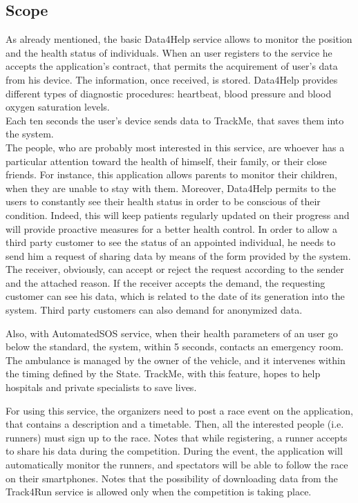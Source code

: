 \subsection{Scope}
As already mentioned, the basic Data4Help service allows to monitor the position and the health status of individuals. When an user registers to the service he accepts the application's contract, that permits the acquirement of user's data from his device. The information, once received, is stored. Data4Help provides different types of diagnostic procedures:  heartbeat, blood pressure and blood oxygen saturation levels.\\ 
Each ten seconds the user's device sends data to TrackMe, that saves them into the system. \\ 
The people, who are probably most interested in this service, are whoever has a particular attention toward the health of himself, their family, or their close friends.
For instance, this application allows parents to monitor their children, when they are unable to stay with them. 
Moreover, Data4Help permits to the users to constantly see their health status in order to be conscious of their condition. Indeed, this will keep patients regularly updated on their progress and will provide proactive measures for a better health control. 
In order to allow a third party customer to see the status of an appointed individual, he needs to send him a request of sharing data by means of the form provided by the system. 
The receiver, obviously, can accept or reject the request according to the sender and the attached reason. 
If the receiver accepts the demand, the requesting customer can see his data, which is related to the date of its generation into the system. Third party customers can also demand for anonymized data. \\ 

\par
Also, with AutomatedSOS service, when their health parameters of an user go below the standard, the system, within 5 seconds, contacts an emergency room.
The ambulance is managed by the owner of the vehicle, and it intervenes within the timing defined by the State.
TrackMe, with this feature, hopes to help hospitals and private specialists to save lives.

\par
For using this service, the organizers need to post a race event on the application, that contains a description and a timetable. 
Then, all the interested people (i.e. runners) must sign up to the race.
Notes that while registering, a runner accepts to share his data during the competition. 
During the event, the application will automatically monitor the runners, and spectators will be able to follow the race on their smartphones. 
Notes that the possibility of downloading data from the Track4Run service is allowed only when the competition is taking place. \\
